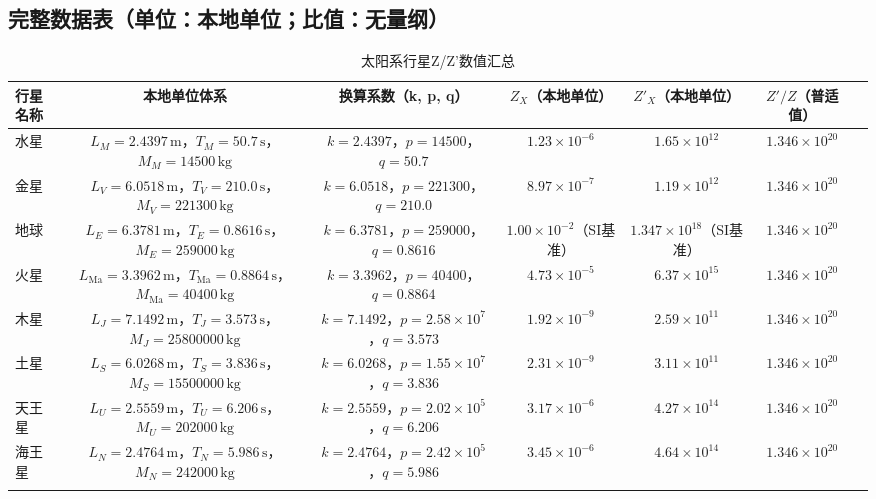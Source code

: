 \documentclass[a4paper, 12pt]{article}
\begin{document}
\subsection{完整数据表（单位：本地单位；比值：无量纲）}
\begin{longtable}{lcccccc}
\toprule
行星名称 & 本地单位体系 & 换算系数（k, p, q） & $Z_X$（本地单位） & $Z'_X$（本地单位） & $Z'/Z$（普适值） \\ 
\midrule
水星     & $L_M = 2.4397 \, \text{m}$，$T_M = 50.7 \, \text{s}$，$M_M = 14500 \, \text{kg}$ & $k=2.4397$，$p=14500$，$q=50.7$     & $1.23 \times 10^{-6}$            & $1.65 \times 10^{12}$            & $1.346 \times 10^{20}$ \\
金星     & $L_V = 6.0518 \, \text{m}$，$T_V = 210.0 \, \text{s}$，$M_V = 221300 \, \text{kg}$ & $k=6.0518$，$p=221300$，$q=210.0$  & $8.97 \times 10^{-7}$            & $1.19 \times 10^{12}$            & $1.346 \times 10^{20}$ \\
地球     & $L_E = 6.3781 \, \text{m}$，$T_E = 0.8616 \, \text{s}$，$M_E = 259000 \, \text{kg}$ & $k=6.3781$，$p=259000$，$q=0.8616$ & $1.00 \times 10^{-2}$（SI基准）  & $1.347 \times 10^{18}$（SI基准） & $1.346 \times 10^{20}$ \\
火星     & $L_{\text{Ma}} = 3.3962 \, \text{m}$，$T_{\text{Ma}} = 0.8864 \, \text{s}$，$M_{\text{Ma}} = 40400 \, \text{kg}$ & $k=3.3962$，$p=40400$，$q=0.8864$  & $4.73 \times 10^{-5}$            & $6.37 \times 10^{15}$            & $1.346 \times 10^{20}$ \\
木星     & $L_J = 7.1492 \, \text{m}$，$T_J = 3.573 \, \text{s}$，$M_J = 25800000 \, \text{kg}$ & $k=7.1492$，$p=2.58 \times 10^7$，$q=3.573$ & $1.92 \times 10^{-9}$            & $2.59 \times 10^{11}$            & $1.346 \times 10^{20}$ \\
土星     & $L_S = 6.0268 \, \text{m}$，$T_S = 3.836 \, \text{s}$，$M_S = 15500000 \, \text{kg}$ & $k=6.0268$，$p=1.55 \times 10^7$，$q=3.836$ & $2.31 \times 10^{-9}$            & $3.11 \times 10^{11}$            & $1.346 \times 10^{20}$ \\
天王星   & $L_U = 2.5559 \, \text{m}$，$T_U = 6.206 \, \text{s}$，$M_U = 202000 \, \text{kg}$ & $k=2.5559$，$p=2.02 \times 10^5$，$q=6.206$ & $3.17 \times 10^{-6}$            & $4.27 \times 10^{14}$            & $1.346 \times 10^{20}$ \\
海王星   & $L_N = 2.4764 \, \text{m}$，$T_N = 5.986 \, \text{s}$，$M_N = 242000 \, \text{kg}$ & $k=2.4764$，$p=2.42 \times 10^5$，$q=5.986$ & $3.45 \times 10^{-6}$            & $4.64 \times 10^{14}$            & $1.346 \times 10^{20}$ \\
\bottomrule
\caption{太阳系行星Z/Z'数值汇总}
\label{tab:planets_zzp}
\end{longtable}
\end{document}
